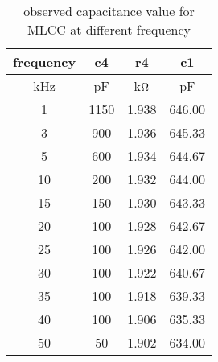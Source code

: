 \begin{table}[H]
\centering
\begin{tabular}{|c|c|c|c|}
    \hline
    frequency & c4   & r4      & c1     \\ \hline
    kHz       & pF   & k$\ohm$ & pF     \\ \hline
    1         & 1150 & 1.938   & 646.00 \\ \hline
    3         & 900  & 1.936   & 645.33 \\ \hline
    5         & 600  & 1.934   & 644.67 \\ \hline
    10        & 200  & 1.932   & 644.00 \\ \hline
    15        & 150  & 1.930   & 643.33 \\ \hline
    20        & 100  & 1.928   & 642.67 \\ \hline
    25        & 100  & 1.926   & 642.00 \\ \hline
    30        & 100  & 1.922   & 640.67 \\ \hline
    35        & 100  & 1.918   & 639.33 \\ \hline
    40        & 100  & 1.906   & 635.33 \\ \hline
    50        & 50   & 1.902   & 634.00 \\ \hline
\end{tabular}
\caption{observed capacitance value for MLCC at different frequency}
\label{tab:2}
\end{table}